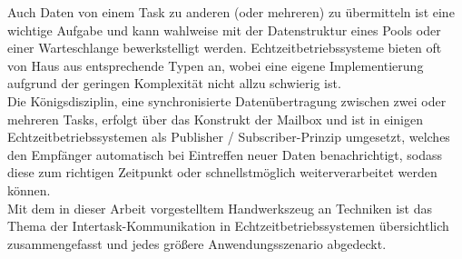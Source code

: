 \documentclass{llncs}
\begin{document}
Auch Daten von einem Task zu anderen (oder mehreren) zu übermitteln ist eine wichtige Aufgabe und kann wahlweise mit der Datenstruktur eines Pools oder einer Warteschlange bewerkstelligt werden. Echtzeitbetriebssysteme bieten oft von Haus aus entsprechende Typen an, wobei eine eigene Implementierung aufgrund der geringen Komplexität nicht allzu schwierig ist.\\

Die Königsdisziplin, eine synchronisierte Datenübertragung zwischen zwei oder mehreren Tasks, erfolgt über das Konstrukt der Mailbox und ist in einigen Echtzeitbetriebssystemen als Publisher / Subscriber-Prinzip umgesetzt, welches den Empfänger automatisch bei Eintreffen neuer Daten benachrichtigt, sodass diese zum richtigen Zeitpunkt oder schnellstmöglich weiterverarbeitet werden können.\\

Mit dem in dieser Arbeit vorgestelltem Handwerkszeug an Techniken ist das Thema der Intertask-Kommunikation in Echtzeitbetriebssystemen übersichtlich zusammengefasst und jedes größere Anwendungsszenario abgedeckt.

\printbibliography
\end{document}
